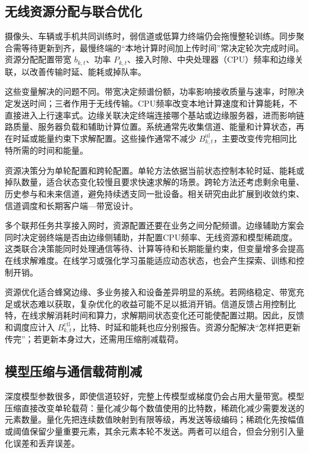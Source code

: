 \subsection{无线资源分配与联合优化}\label{subsec:resource-allocation}

摄像头、车辆或手机共同训练时，弱信道或低算力终端仍会拖慢整轮训练。同步聚合需等待更新到齐，最慢终端的“本地计算时间加上传时间”常决定轮次完成时间。资源分配配置带宽 \(b_{k,t}\)、功率 \(P_{k,t}\)、接入时隙、中央处理器（CPU）频率和边缘关联，以改善传输时延、能耗或掉队率。

这些变量解决的问题不同。带宽决定频谱份额，功率影响接收质量与速率，时隙决定发送时间；三者作用于无线传输。CPU频率改变本地计算速度和计算能耗，不直接进入上行速率式。边缘关联决定终端连接哪个基站或边缘服务器，进而影响链路质量、服务器负载和辅助计算位置。系统通常先收集信道、能量和计算状态，再在时延或能量约束下求解配置\cite{Tran2019WirelessOptimization,Dinh2021WirelessConvergence}。这些操作通常不减少 \(B_{k,t}^{\mathrm{ul}}\)，主要改变传完相同比特所需的时间和能量。

资源决策分为单轮配置和跨轮配置。单轮方法依据当前状态控制本轮时延、能耗或掉队数量，适合状态变化较慢且要求快速求解的场景。跨轮方法还考虑剩余电量、历史参与和未来信道，避免持续透支同一批设备。相关研究由此扩展到收敛约束、信道调度和长期客户端—带宽设计\cite{Tran2019WirelessOptimization,Dinh2021WirelessConvergence,Yang2020Scheduling,Xu2021ClientBandwidth}。

多个联邦任务共享接入网时，资源配置还要在业务之间分配频谱。边缘辅助方案会同时决定弱终端是否由边缘侧辅助，并配置CPU频率、无线资源和模型稀疏度\cite{Xu2022MultiFLBandwidth,Chen2025EdgeAssistedSparsification}。这类联合决策能同时处理通信等待、计算等待和长期能量约束，但变量增多会提高在线求解难度。在线学习或强化学习虽能适应动态状态，也会产生探索、训练和控制开销。

资源优化适合蜂窝边缘、多业务接入和设备差异明显的系统。若网络稳定、带宽充足或状态难以获取，复杂优化的收益可能不足以抵消开销。信道反馈占用控制比特，在线求解消耗时间和算力，求解期间状态变化还可能使配置过期。因此，反馈和调度应计入 \(B_{k,t}^{\mathrm{ctl}}\)，比特、时延和能耗也应分别报告。资源分配解决“怎样把更新传完”；若更新本身过大，还需用压缩削减载荷。

\subsection{模型压缩与通信载荷削减}\label{subsec:model-compression}

深度模型参数很多，即使信道较好，完整上传模型或梯度仍会占用大量带宽。模型压缩直接改变单轮载荷：量化减少每个数值使用的比特数，稀疏化减少需要发送的元素数量。量化先把连续数值映射到有限等级，再发送等级编码；稀疏化先按幅值或阈值保留少量重要元素，其余元素本轮不发送。两者可以组合，但会分别引入量化误差和丢弃误差。

